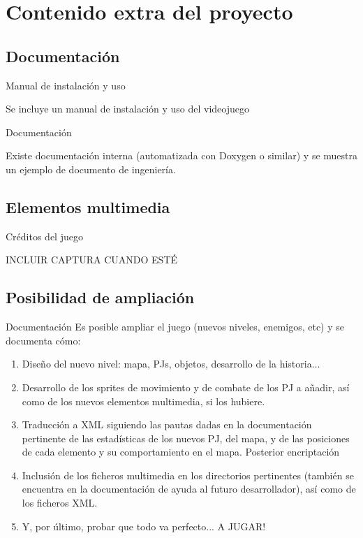 \documentclass[9pt,xcolor=svgnames]{beamer}
\begin{document}
 \section{Contenido extra del proyecto}

  \subsection{Documentación}

   \begin{frame}{Manual de instalación y uso}
    \transdissolve
    
    Se incluye un manual de instalación y uso del videojuego
   \end{frame}


   \begin{frame}{Documentación}
    \transdissolve
    
    Existe documentación interna (automatizada con Doxygen o similar) y
    se muestra un ejemplo de documento de ingeniería.

   \end{frame}


   \subsection{Elementos multimedia}

   \begin{frame}{Créditos del juego}
   \transdissolve

    INCLUIR CAPTURA CUANDO ESTÉ
   \end{frame}



  \subsection{Posibilidad de ampliación}


   \begin{frame}{Documentación}
    Es posible ampliar el juego (nuevos niveles, enemigos, etc) y se
    documenta cómo:

    \begin{enumerate}
     \item Diseño del nuevo nivel: mapa, PJs, objetos, desarrollo de la
	   historia...
     \item Desarrollo de los sprites de movimiento y de combate de los
	   PJ a añadir, así como de los nuevos elementos multimedia, si
	   los hubiere.
     \item Traducción a XML siguiendo las pautas dadas en la
	   documentación pertinente de las estadísticas de los nuevos
	   PJ, del mapa, y de las posiciones de cada elemento y su
	   comportamiento en el mapa. Posterior encriptación
     \item Inclusión de los ficheros multimedia en los directorios
	   pertinentes (también se encuentra en la documentación de
	   ayuda al futuro desarrollador), así como de los ficheros XML.
     \item Y, por último, probar que todo va perfecto... A JUGAR!
    \end{enumerate}
   \end{frame}
\end{document}
